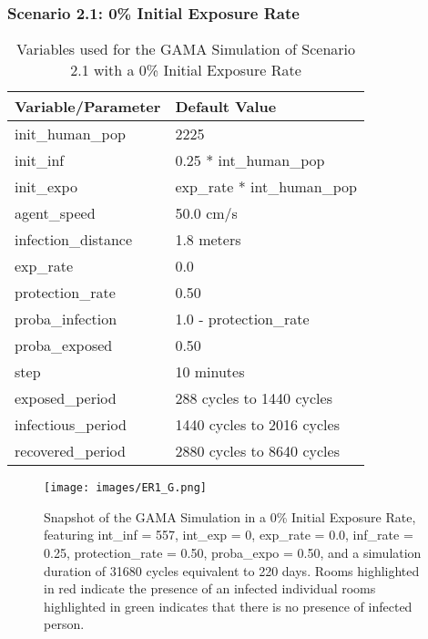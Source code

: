 \subsubsection{Scenario 2.1: 0\% Initial Exposure Rate}
\begin{table}[H]
	\centering
	\begin{tabular}{ll}
		\toprule
		\textbf{Variable/Parameter} & \textbf{Default Value}\\
		\hline
		init\_human\_pop & 2225\\
		init\_inf & 0.25 * int\_human\_pop\\
		init\_expo & exp\_rate * int\_human\_pop \\
		agent\_speed & 50.0 cm/s\\
		infection\_distance & 1.8 meters\\
		exp\_rate & 0.0\\
		protection\_rate & 0.50\\
		proba\_infection & 1.0 - protection\_rate\\
		proba\_exposed & 0.50\\
		step & 10 minutes\\
		exposed\_period & 288 cycles to 1440 cycles\\
		infectious\_period & 1440 cycles to 2016 cycles\\
		recovered\_period & 2880 cycles to 8640 cycles\\ 
		\bottomrule
	\end{tabular}
	\caption{Variables used for the GAMA Simulation of Scenario 2.1 with a 0\% Initial Exposure Rate}
	\label{2.1a}
\end{table}
\begin{figure}[H]
	\centering
	\texttt{[image: images/ER1\_G.png]}
	\caption{Snapshot of the GAMA Simulation in a 0\% Initial Exposure Rate, featuring int\_inf = 557, int\_exp = 0, exp\_rate = 0.0, inf\_rate = 0.25, protection\_rate = 0.50, proba\_expo = 0.50, and a simulation duration of 31680 cycles equivalent to 220 days. Rooms highlighted in red indicate the presence of an infected individual rooms highlighted in green indicates that there is no presence of infected person.}
\label{ER1G}
\end{figure}

